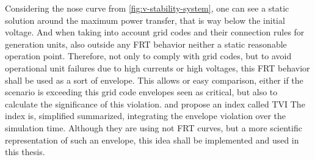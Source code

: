Considering the nose curve from \autoref{fig:v-stability-system}, one can see a static solution around the maximum power transfer, that is way below the initial voltage.
And when taking into account grid codes and their connection rules for generation units, also outside any \ac{FRT} behavior neither a static reasonable operation point.
Therefore, not only to comply with grid codes, but to avoid operational unit failures due to high currents or high voltages, this \acs{FRT} behavior shall be used as a sort of envelope.
This allows or easy comparison, either if the scenario is exceeding this grid code envelopes seen as critical, but also to calculate the significance of this violation.
\textcite{scheiner_2022} and \textcite{wildenhues_2015} propose an index called \ac{TVI}
The index is, simplified summarized, integrating the envelope violation over the simulation time.
Although they are using not \acs{FRT} curves, but a more scientific representation of such an envelope, this idea shall be implemented and used in this thesis.


